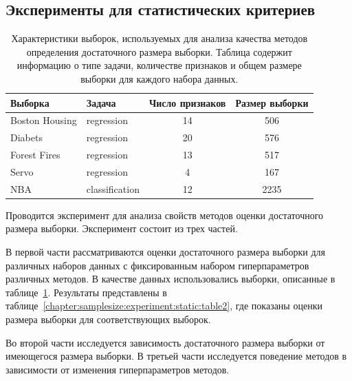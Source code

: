 \subsection{Эксперименты для статистических критериев}
\begin{table}[h!t]
\centering
\caption{Характеристики выборок, используемых для анализа качества методов определения достаточного размера выборки. Таблица содержит информацию о типе задачи, количестве признаков и общем размере выборки для каждого набора данных.}
\label{chapter:samplesize:experiment:static:table20}
\begin{tabular}{|l|l|c|c|}
\hline
	\centering Выборка & Задача & Число признаков & Размер выборки\\ \hline
	\hline 	Boston Housing 	&regression		&14 & 506\\
	\hline	Diabets  				& regression		&20  & 576\\
	\hline	Forest Fires 			& regression		& 13 & 517\\
  	\hline	Servo 					& regression 	& 4   & 167\\
	\hline	NBA				 		& classification	& 12 & 2235\\
\hline
\end{tabular}
\end{table}

Проводится эксперимент для анализа свойств методов оценки достаточного размера выборки. Эксперимент состоит из трех частей.

В первой части рассматриваются оценки достаточного размера выборки для различных наборов данных с фиксированным набором гиперпараметров различных методов. В качестве данных использовались выборки, описанные в таблице~\ref{chapter:samplesize:experiment:static:table20}. Результаты представлены в таблице~\ref{chapter:samplesize:experiment:static:table2}, где показаны оценки размера выборки для соответствующих выборок.

Во второй части исследуется зависимость достаточного размера выборки от имеющегося размера выборки. В третьей части исследуется поведение методов в зависимости от изменения гиперпараметров методов.

